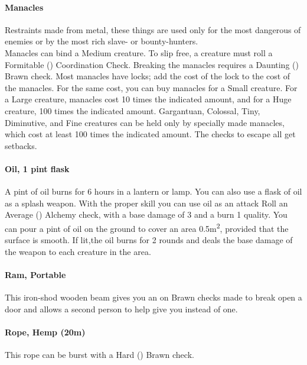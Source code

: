 \begin{multicols}{2}
\paragraph{Manacles} \label{advitm:manacles}
Restraints made from metal, these things are used only for
the most dangerous of enemies or by the most rich slave- or
bounty-hunters.\\
Manacles can bind a Medium creature. To slip free, a
creature must roll a Formitable (\difficulty\difficulty\difficulty\difficulty)
Coordination Check.  Breaking the manacles requires a
Daunting (\difficulty\difficulty\difficulty\difficulty) Brawn check.
Most manacles have locks; add the cost of the lock
to the cost of the manacles.
For the same cost, you can buy manacles for a Small
creature. For a Large creature, manacles cost 10 times
the indicated amount, and for a Huge creature, 100
times the indicated amount. Gargantuan, Colossal, Tiny,
Diminutive, and Fine creatures can be held only by
specially made manacles, which cost at least 100 times
the indicated amount.
The checks to escape all get setbacks.

\paragraph{Oil, 1 pint flask} \label{advitm:oil}
A pint of oil burns for 6 hours in a lantern or lamp.
You can also use a flask of oil as a splash weapon.
With the proper skill you can use oil as an attack
Roll an Average (\difficulty\difficulty) Alchemy check,
with a base damage of 3 and a burn 1 quality. You
can pour a pint of oil on the ground to cover an
area 0.5m\textsuperscript{2}, provided that the surface is
smooth. If lit,the oil burns for 2 rounds and deals
the base damage of the weapon to each creature in
the area.

\paragraph{Ram, Portable} \label{advitm:ram}
This iron-shod wooden beam gives you an \boost on
Brawn checks made to break open a door and
allows a second person to help give you \boost\boost
instead of one.

\paragraph{Rope, Hemp (20m)} \label{advitm:rope_hemp}
This rope can be burst with a Hard (\difficulty\difficulty\difficulty)
Brawn check.


\end{multicols}
